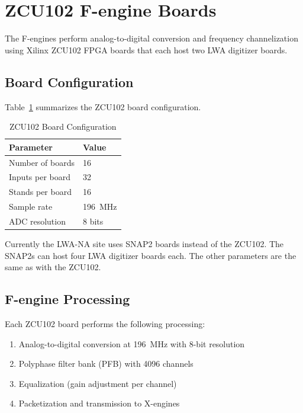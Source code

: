 \section{ZCU102 F-engine Boards}

The F-engines perform analog-to-digital conversion and frequency channelization using Xilinx ZCU102 FPGA boards that each host two LWA digitizer boards.

\subsection{Board Configuration}

Table~\ref{tab:zcu-config} summarizes the ZCU102 board configuration.

\begin{table}[htbp]
    \centering
    \caption{ZCU102 Board Configuration}
    \label{tab:zcu-config}
    \begin{tabular}{ll}
        \toprule
        \textbf{Parameter} & \textbf{Value} \\
        \midrule
        Number of boards & 16 \\
        Inputs per board & 32 \\
        Stands per board & 16 \\
        Sample rate & 196~MHz \\
        ADC resolution & 8 bits \\
        \bottomrule
    \end{tabular}
\end{table}

\begin{siteNote}
Currently the LWA-NA site uses SNAP2 boards instead of the ZCU102.  The SNAP2s can host four LWA digitizer boards each.  The other parameters are the same as with the ZCU102.
\end{siteNote}

\subsection{F-engine Processing}

Each ZCU102 board performs the following processing:
\begin{enumerate}
    \item Analog-to-digital conversion at 196~MHz with 8-bit resolution
    \item Polyphase filter bank (PFB) with 4096 channels
    \item Equalization (gain adjustment per channel)
    \item Packetization and transmission to X-engines
\end{enumerate}

